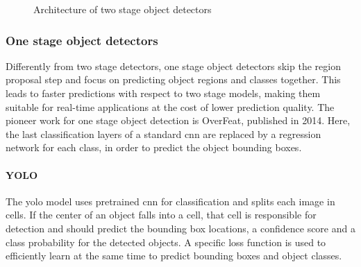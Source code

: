 \documentclass[%
    corpo=12pt,
    twoside,
    stile=classica,   
    tipotesi=magistrale,
    evenboxes,
    english,
	numerazioneromana,
]{toptesi}
\begin{document}
\begin{figure}[ht]
	\centering
	\caption{Architecture of two stage object detectors}
	\label{fig:architectures}
\end{figure}

\subsubsection{One stage object detectors}
Differently from two stage detectors, one stage object detectors skip the region proposal step and focus on predicting object regions and classes together. This leads to faster predictions with respect to two stage models, making them suitable for real-time applications at the cost of lower prediction quality. The pioneer work for one stage object detection is OverFeat\cite{sermanet2014overfeat}, published in 2014. Here, the last classification layers of a standard \gls{cnn} are replaced by a regression network for each class, in order to predict the object bounding boxes.

\paragraph{YOLO}\label{sec:yolo}
The \acrfull{yolo} model\cite{redmon2016look} uses pretrained \gls{cnn} for classification and splits each image in cells. If the center of an object falls into a cell, that cell is responsible for detection and should predict the bounding box locations, a confidence score and a class probability for the detected objects. A specific loss function is used to efficiently learn at the same time to predict bounding boxes and object classes.
\end{document}
